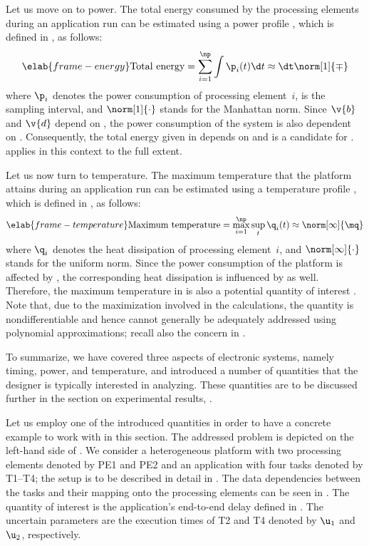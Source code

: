 Let us move on to power. The total energy consumed by the \np processing
elements during an application run can be estimated using a power profile \mp,
which is defined in , as follows:
\begin{equation} \elab{frame-energy}
  \text{Total energy}
  = \sum_{i = 1}^\np \int \p_i(t) \d t
  \approx \dt \norm[1]{\mp}
\end{equation}
where $\p_i$ denotes the power consumption of processing element~$i$, \dt is the
sampling interval, and $\norm[1]{\cdot}$ stands for the Manhattan norm. Since
$\v{b}$ and $\v{d}$ depend on \vu, the power consumption of the system is also
dependent on \vu. Consequently, the total energy given in 
depends on \vu and is a candidate for \g.  applies in
this context to the full extent.

Let us now turn to temperature. The maximum temperature that the platform
attains during an application run can be estimated using a temperature profile
\mq, which is defined in , as follows:
\begin{equation} \elab{frame-temperature}
  \text{Maximum temperature}
  = \max_{i = 1}^\np \sup_{t} \q_i(t)
  \approx \norm[\infty]{\mq}
\end{equation}
where $\q_i$ denotes the heat dissipation of processing element~$i$, and
$\norm[\infty]{\cdot}$ stands for the uniform norm. Since the power consumption
of the platform is affected by \vu, the corresponding heat dissipation is
influenced by \vu as well. Therefore, the maximum temperature in
 is also a potential quantity of interest \g. Note that,
due to the maximization involved in the calculations, the quantity is
nondifferentiable and hence cannot generally be adequately addressed using
polynomial approximations; recall also the concern in
.

To summarize, we have covered three aspects of electronic systems, namely
timing, power, and temperature, and introduced a number of quantities that the
designer is typically interested in analyzing. These quantities are to be
discussed further in the section on experimental results, .

Let us employ one of the introduced quantities in order to have a concrete
example to work with in this section. The addressed problem is depicted on the
left-hand side of . We consider a heterogeneous platform
with two processing elements denoted by PE1 and PE2 and an application with four
tasks denoted by T1--T4; the setup is to be described in detail in
. The data dependencies between the tasks and their mapping
onto the processing elements can be seen in . The
quantity of interest \g is the application's end-to-end delay defined in
. The uncertain parameters \vu are the execution times of T2
and T4 denoted by $\u_1$ and $\u_2$, respectively.

